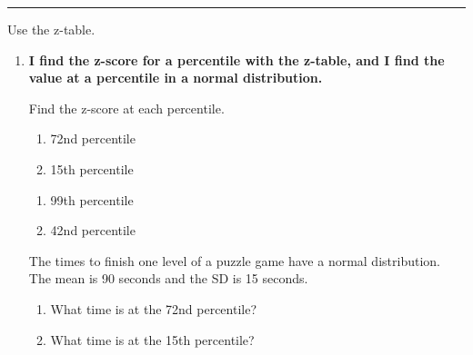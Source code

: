 \documentclass[11pt]{article}
\newcommand{\lessonhead}[1]{\par\vspace{0.6em}{\large\bfseries #1}\par\vspace{0.25em}\hrule\vspace{0.6em}}
\newcommand{\goal}[1]{\textbf{#1}\par\vspace{0.35em}}
\begin{document}
\newpage
\lessonhead{2.6 - Normal Calculations in Reverse}
Use the z-table.
\begin{enumerate}[resume]

\item \goal{I find the z-score for a percentile with the z-table, and I find the value at a percentile in a normal distribution.}
Find the z-score at each percentile.

\begin{minipage}[t]{0.48\linewidth}\vspace{0pt}\raggedright
\begin{enumerate}[itemsep=1.2em]
  \item 72nd percentile 
  \item 15th percentile 
\end{enumerate}
\end{minipage}\hfill
\begin{minipage}[t]{0.48\linewidth}\vspace{0pt}\raggedright
\begin{enumerate}[start=3,itemsep=1.2em]
  \item 99th percentile 
  \item 42nd percentile 
\end{enumerate}
\end{minipage}

\vspace{0.8em}
The times to finish one level of a puzzle game have a normal distribution. The mean is 90 seconds and the SD is 15 seconds.
\begin{enumerate}[start=5,itemsep=1em]
  \item What time is at the 72nd percentile?

  \work{3em}
  \item What time is at the 15th percentile?

  \work{3em}
\end{enumerate}


\end{enumerate}
\end{document}
